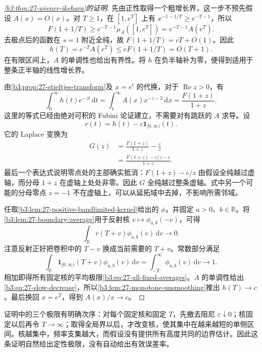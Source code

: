 \begin{proof}[\cref{b3:thm:27-wiener-ikehara}的证明]
先由正性取得一个粗增长界，这一步不预先假设 \(A(x)=O(x)\)。对 \(T\ge1\)，在 \([1,e^T]\) 上有 \(x^{-1-1/T}\ge e^{-T-1}\)，所以
\[
 F(1+1/T)\ge e^{-T-1}\mu_A([1,e^T])
 =e^{-T-1}A(e^T).
\]
去极点后的函数在 \(s=1\) 附近全纯，故
\(F(1+1/T)=cT+O(1)\)。因此
\[
 h(T)=e^{-T}A(e^T)\le eF(1+1/T)=O(T+1).
\]
在有限区间上，\(A\) 的单调性也给出有界性。将 \(h\) 在负半轴补为零，便得到适用于整条正半轴的线性增长界。

由\cref{b3:prop:27-stieltjes-transform}及 \(x=e^t\) 的代换，对于 \(\operatorname{Re}z>0\)，有
\[
 \int_0^\infty h(t)e^{-zt}\,\mathrm dt
 =\int_1^\infty A(x)x^{-z-2}\,\mathrm dx
 =\frac{F(1+z)}{1+z}.
\]
这里的等式已经由绝对可积的 Fubini 论证建立，不需要对有跳跃的 \(A\) 求导。设
\[
 r(t)=h(t)-c\mathbf1_{[0,\infty)}(t).
\]
它的 Laplace 变换为
\begin{equation}
\label{b3:eq:27-laplace-subtraction}
 \begin{aligned}
 G(z)&=\frac{F(1+z)}{1+z}-\frac cz\\
 &=\frac{F(1+z)-c/z-c}{1+z}.
 \end{aligned}
\end{equation}
最后一个表达式说明零点处的主部确实抵消：\(F(1+z)-c/z\) 由假设全纯越过虚轴，而分母 \(1+z\) 在虚轴上处处非零。因此 \(G\) 全纯越过整条虚轴。式中另一个可能的分母零点 \(z=-1\) 不在虚轴上，可以从延拓域中去掉，不影响所需邻域。

任取\cref{b3:lem:27-positive-bandlimited-kernel}给出的 \(\phi\)，并固定 \(a>0\)、\(b\in\mathbb R\)。将\cref{b3:lem:27-boundary-average}用于反射核 \(v\mapsto\phi_{a,b}(-v)\)，可得
\[
 \int_{\mathbb R}r(T+v)\phi_{a,b}(v)\,\mathrm dv\longrightarrow0.
\]
注意反射正好把卷积中的 \(T-v\) 换成当前需要的 \(T+v\)。常数部分满足
\[
 \int_{\mathbb R}\mathbf1_{[0,\infty)}(T+v)
       \phi_{a,b}(v)\,\mathrm dv
 =\int_{-T}^\infty\phi_{a,b}(v)\,\mathrm dv\longrightarrow1.
\]
相加即得所有固定核的平均极限\eqref{b3:eq:27-all-fixed-averages}。\(A\) 的单调性给出\eqref{b3:eq:27-slow-decrease}，所以\cref{b3:lem:27-monotone-unsmoothing}推出 \(h(T)\to c\)。最后换回 \(x=e^T\)，得到 \(A(x)/x\to c\)。
\end{proof}

证明中的三个极限有明确次序：对每个固定核和固定 \(T\)，先撤去阻尼 \(\varepsilon\downarrow0\)；核固定以后再令 \(T\to\infty\)；取得全局界以后，才改变核，使其集中在越来越短的单侧区间。核越集中，频率支集越大，而假设没有提供所有高度共同的边界估计。因此这条证明自然给出定性极限，没有自动给出有效误差率。

